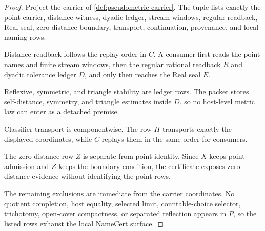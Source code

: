 \begin{proof}
Project the carrier of \autoref{def:pseudometric-carrier}. The tuple lists exactly the point carrier, distance witness, dyadic ledger, stream windows, regular readback, Real seal, zero-distance boundary, transport, continuation, provenance, and local naming rows.

Distance readback follows the replay order in $C$. A consumer first reads the point names and finite stream windows, then the regular rational readback $R$ and dyadic tolerance ledger $D$, and only then reaches the Real seal $E$.

Reflexive, symmetric, and triangle stability are ledger rows. The packet stores self-distance, symmetry, and triangle estimates inside $D$, so no host-level metric law can enter as a detached premise.

Classifier transport is componentwise. The row $H$ transports exactly the displayed coordinates, while $C$ replays them in the same order for consumers.

The zero-distance row $Z$ is separate from point identity. Since $X$ keeps point admission and $Z$ keeps the boundary condition, the certificate exposes zero-distance evidence without identifying the point rows.

The remaining exclusions are immediate from the carrier coordinates. No quotient completion, host equality, selected limit, countable-choice selector, trichotomy, open-cover compactness, or separated reflection appears in $P$, so the listed rows exhaust the local NameCert surface.
\end{proof}

